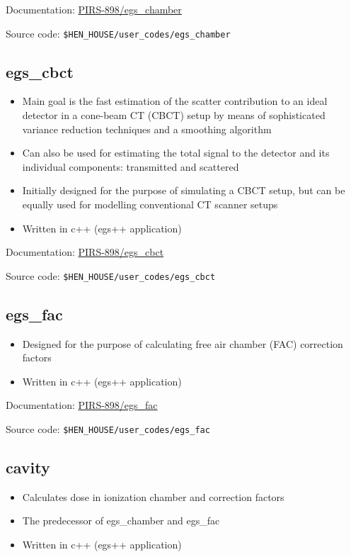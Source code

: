 \documentclass[12pt,twoside]{article}
\begin{document}
Documentation: \href{http://nrc-cnrc.github.io/EGSnrc/doc/pirs898/egs\_chamber.html}{PIRS-898/egs\_chamber}

Source code: \Verb+$HEN_HOUSE/user_codes/egs_chamber+

\subsection{egs\_cbct}
\begin{itemize}
\item Main goal is the fast estimation of the scatter contribution to an ideal detector in a cone-beam CT (CBCT) setup by means of sophisticated variance reduction techniques and a smoothing algorithm
\item Can also be used for estimating the total signal to the detector and its individual components: transmitted and scattered
\item Initially designed for the purpose of simulating a CBCT setup, but can be equally used for modelling conventional CT scanner setups
\item Written in c++ (egs++ application)
\end{itemize}

Documentation: \href{http://nrc-cnrc.github.io/EGSnrc/doc/pirs898/egs\_cbct.html}{PIRS-898/egs\_cbct}

Source code: \Verb+$HEN_HOUSE/user_codes/egs_cbct+

\subsection{egs\_fac}
\begin{itemize}
\item Designed for the purpose of calculating free air chamber (FAC) correction factors
\item Written in c++ (egs++ application)
\end{itemize}

Documentation: \href{http://nrc-cnrc.github.io/EGSnrc/doc/pirs898/egs\_fac.html}{PIRS-898/egs\_fac}

Source code: \Verb+$HEN_HOUSE/user_codes/egs_fac+

\subsection{cavity}
\begin{itemize}
\item Calculates dose in ionization chamber and correction factors
\item The predecessor of egs\_chamber and egs\_fac
\item Written in c++ (egs++ application)
\end{itemize}
\end{document}
